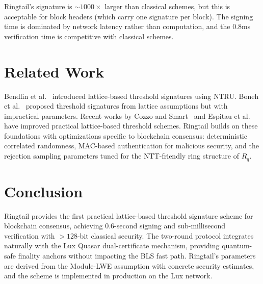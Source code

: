 \documentclass[11pt,a4paper]{article}
\begin{document}
Ringtail's signature is $\sim 1000\times$ larger than classical schemes, but this is
acceptable for block headers (which carry one signature per block). The signing time
is dominated by network latency rather than computation, and the 0.8ms verification
time is competitive with classical schemes.

\section{Related Work}
\label{sec:related}

Bendlin et al.~\cite{bendlin2013semi} introduced lattice-based threshold signatures
using NTRU. Boneh et al.~\cite{boneh2018threshold} proposed threshold signatures from
lattice assumptions but with impractical parameters. Recent works by Cozzo and
Smart~\cite{cozzo2023sharing} and Espitau et al.~\cite{espitau2024fiat} have improved
practical lattice-based threshold schemes. Ringtail builds on these foundations with
optimizations specific to blockchain consensus: deterministic correlated randomness,
MAC-based authentication for malicious security, and the rejection sampling parameters
tuned for the NTT-friendly ring structure of $R_q$.

\section{Conclusion}
\label{sec:conclusion}

Ringtail provides the first practical lattice-based threshold signature scheme for
blockchain consensus, achieving 0.6-second signing and sub-millisecond verification
with $> 128$-bit classical security. The two-round protocol integrates naturally with
the Lux Quasar dual-certificate mechanism, providing quantum-safe finality anchors
without impacting the BLS fast path. Ringtail's parameters are derived from the
Module-LWE assumption with concrete security estimates, and the scheme is implemented
in production on the Lux network.
\end{document}
